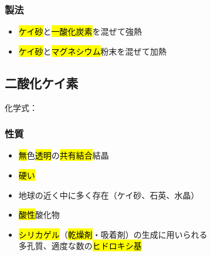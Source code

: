\subsubsection{製法}
\begin{itemize}
      \item \hl{ケイ砂}と\hl{一酸化炭素}を混ぜて強熱 \K\\
      \item \hl{ケイ砂}と\hl{マグネシウム}粉末を混ぜて加熱\\
\end{itemize}
\subsection{二酸化ケイ素}
化学式：\hl{}
\subsubsection{性質}
\begin{itemize}
      \item \hl{無}色\hl{透明}の\hl{共有結合}結晶
      \item \hl{硬い}
      \item 地球の近く中に多く存在（ケイ砂、石英、水晶）
      \item \hl{酸性}酸化物
      \item \hl{シリカゲル}（\hl{乾燥剤}・吸着剤）の生成に用いられる\\
            多孔質、適度な数の\hl{ヒドロキシ基}
\end{itemize}
